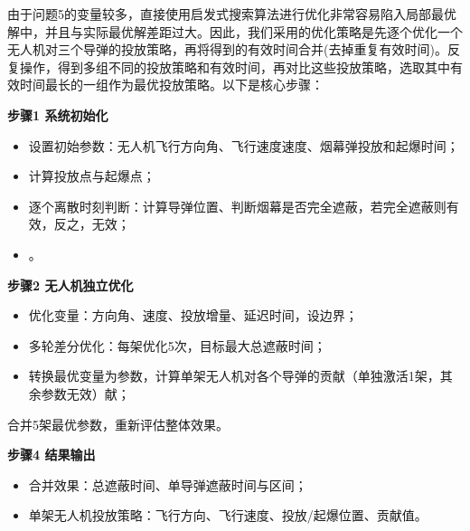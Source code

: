 \documentclass[../main.tex]{subfiles}
\begin{document}

由于问题5的变量较多，直接使用启发式搜索算法进行优化非常容易陷入局部最优解中，并且与实际最优解差距过大。因此，我们采用的优化策略是先逐个优化一个无人机对三个导弹的投放策略，再将得到的有效时间合并(去掉重复有效时间)。反复操作，得到多组不同的投放策略和有效时间，再对比这些投放策略，选取其中有效时间最长的一组作为最优投放策略。以下是核心步骤：

\textbf{步骤1 系统初始化}
\begin{itemize}
    \item 设置初始参数：无人机飞行方向角、飞行速度速度、烟幕弹投放和起爆时间；
    \item 计算投放点与起爆点；
    \item 逐个离散时刻判断：计算导弹位置、判断烟幕是否完全遮蔽，若完全遮蔽则有效，反之，无效；
    \item 。
\end{itemize}

\textbf{步骤2 无人机独立优化}
\begin{itemize}
    \item 优化变量：方向角、速度、投放增量、延迟时间，设边界；
    \item 多轮差分优化：每架优化5次，目标最大总遮蔽时间；
    \item 转换最优变量为参数，计算单架无人机对各个导弹的贡献（单独激活1架，其余参数无效）献；
\end{itemize}

合并5架最优参数，重新评估整体效果。

\textbf{步骤4 结果输出}
\begin{itemize}
    \item 合并效果：总遮蔽时间、单导弹遮蔽时间与区间；
    \item 单架无人机投放策略：飞行方向、飞行速度、投放/起爆位置、贡献值。
\end{itemize}
\end{document}
